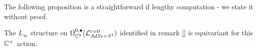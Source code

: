The following proposition is a straightforward if lengthy computation - we state it without proof.
\begin{prop}\label{prop:ads7decomp}
The $L_\infty$ structure on $\Omega^{0,\bullet}_{\mathbb{C}^3} (\mathcal{L}^{{r=0}}_{AdS_7\times S^4} )$ identified in remark \ref{} is equivariant for this $\mathbb{C}^\times$ action. 
\end{prop}

%
